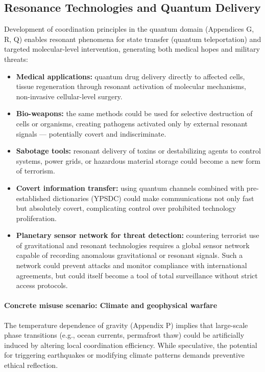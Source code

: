 \documentclass[12pt,a4paper]{article}
\theoremstyle{remark}
\begin{document}
	\subsection{Resonance Technologies and Quantum Delivery}
	\label{subsec:resonance}
	
	Development of coordination principles in the quantum domain (Appendices G, R, Q) enables resonant phenomena for state transfer (quantum teleportation) and targeted molecular-level intervention, generating both medical hopes and military threats:
	\begin{itemize}[leftmargin=*]
		\item \textbf{Medical applications:} quantum drug delivery directly to affected cells, tissue regeneration through resonant activation of molecular mechanisms, non-invasive cellular-level surgery.
		\item \textbf{Bio-weapons:} the same methods could be used for selective destruction of cells or organisms, creating pathogens activated only by external resonant signals — potentially covert and indiscriminate.
		\item \textbf{Sabotage tools:} resonant delivery of toxins or destabilizing agents to control systems, power grids, or hazardous material storage could become a new form of terrorism.
		\item \textbf{Covert information transfer:} using quantum channels combined with pre-established dictionaries (YPSDC) could make communications not only fast but absolutely covert, complicating control over prohibited technology proliferation.
		\item \textbf{Planetary sensor network for threat detection:} countering terrorist use of gravitational and resonant technologies requires a global sensor network capable of recording anomalous gravitational or resonant signals. Such a network could prevent attacks and monitor compliance with international agreements, but could itself become a tool of total surveillance without strict access protocols.
	\end{itemize}
	
	\paragraph{Concrete misuse scenario: Climate and geophysical warfare}
	The temperature dependence of gravity (Appendix P) implies that large-scale phase transitions (e.g., ocean currents, permafrost thaw) could be artificially induced by altering local coordination efficiency. While speculative, the potential for triggering earthquakes or modifying climate patterns demands preventive ethical reflection.
	
\end{document}
